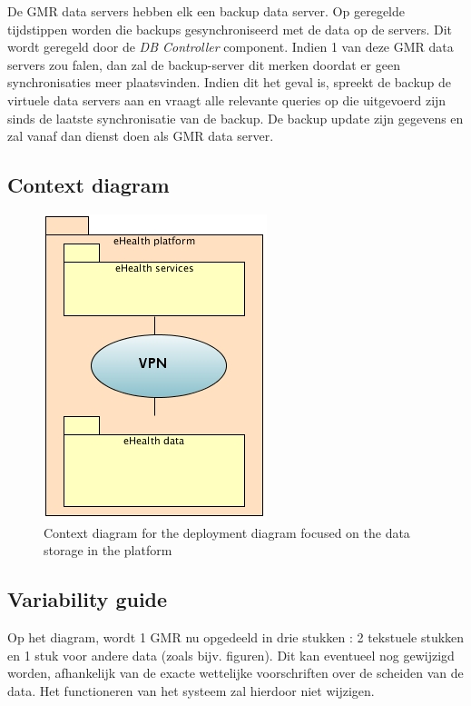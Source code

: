 \documentclass[a4paper,10pt]{article}
\begin{document}
De GMR data servers hebben elk een backup data server. Op geregelde tijdstippen worden die backups gesynchroniseerd met de data op de servers. Dit wordt geregeld door de \textit{DB Controller} component. Indien 1 van deze GMR data servers zou falen, dan zal de backup-server dit merken doordat er geen synchronisaties meer plaatsvinden. Indien dit het geval is, spreekt de backup de virtuele data servers aan en vraagt alle relevante queries op die uitgevoerd zijn sinds de laatste synchronisatie van de backup. De backup update zijn gegevens en zal vanaf dan dienst doen als GMR data server.

\clearpage
\subsection{Context diagram}
\begin{center}
    \begin{figure}[!h]
      \includegraphics[scale=0.50]{../images/deployment_data_context.jpg}
	\caption{Context diagram for the deployment diagram focused on the data storage in the platform}
    \end{figure}
  \end{center}

\subsection{Variability guide}
Op het diagram, wordt 1 GMR nu opgedeeld in drie stukken : 2 tekstuele stukken en 1 stuk voor andere data (zoals bijv. figuren). Dit kan eventueel nog gewijzigd worden, afhankelijk van de exacte wettelijke voorschriften over de scheiden van de data. Het functioneren van het systeem zal hierdoor niet wijzigen.
\end{document}
